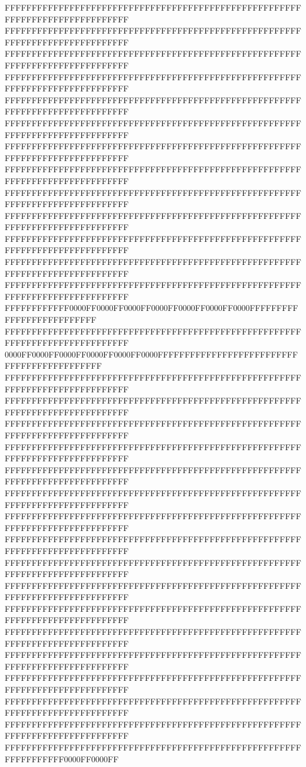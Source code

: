 FFFFFFFFFFFFFFFFFFFFFFFFFFFFFFFFFFFFFFFFFFFFFFFFFFFFFFFFFFFFFFFFFFFFFFFFFFFFFF
FFFFFFFFFFFFFFFFFFFFFFFFFFFFFFFFFFFFFFFFFFFFFFFFFFFFFFFFFFFFFFFFFFFFFFFFFFFFFF
FFFFFFFFFFFFFFFFFFFFFFFFFFFFFFFFFFFFFFFFFFFFFFFFFFFFFFFFFFFFFFFFFFFFFFFFFFFFFF
FFFFFFFFFFFFFFFFFFFFFFFFFFFFFFFFFFFFFFFFFFFFFFFFFFFFFFFFFFFFFFFFFFFFFFFFFFFFFF
FFFFFFFFFFFFFFFFFFFFFFFFFFFFFFFFFFFFFFFFFFFFFFFFFFFFFFFFFFFFFFFFFFFFFFFFFFFFFF
FFFFFFFFFFFFFFFFFFFFFFFFFFFFFFFFFFFFFFFFFFFFFFFFFFFFFFFFFFFFFFFFFFFFFFFFFFFFFF
FFFFFFFFFFFFFFFFFFFFFFFFFFFFFFFFFFFFFFFFFFFFFFFFFFFFFFFFFFFFFFFFFFFFFFFFFFFFFF
FFFFFFFFFFFFFFFFFFFFFFFFFFFFFFFFFFFFFFFFFFFFFFFFFFFFFFFFFFFFFFFFFFFFFFFFFFFFFF
FFFFFFFFFFFFFFFFFFFFFFFFFFFFFFFFFFFFFFFFFFFFFFFFFFFFFFFFFFFFFFFFFFFFFFFFFFFFFF
FFFFFFFFFFFFFFFFFFFFFFFFFFFFFFFFFFFFFFFFFFFFFFFFFFFFFFFFFFFFFFFFFFFFFFFFFFFFFF
FFFFFFFFFFFFFFFFFFFFFFFFFFFFFFFFFFFFFFFFFFFFFFFFFFFFFFFFFFFFFFFFFFFFFFFFFFFFFF
FFFFFFFFFFFFFFFFFFFFFFFFFFFFFFFFFFFFFFFFFFFFFFFFFFFFFFFFFFFFFFFFFFFFFFFFFFFFFF
FFFFFFFFFFFFFFFFFFFFFFFFFFFFFFFFFFFFFFFFFFFFFFFFFFFFFFFFFFFFFFFFFFFFFFFFFFFFFF
FFFFFFFFFFFF0000FF0000FF0000FF0000FF0000FF0000FF0000FFFFFFFFFFFFFFFFFFFFFFFFFF
FFFFFFFFFFFFFFFFFFFFFFFFFFFFFFFFFFFFFFFFFFFFFFFFFFFFFFFFFFFFFFFFFFFFFFFFFFFFFF
0000FF0000FF0000FF0000FF0000FF0000FFFFFFFFFFFFFFFFFFFFFFFFFFFFFFFFFFFFFFFFFFFF
FFFFFFFFFFFFFFFFFFFFFFFFFFFFFFFFFFFFFFFFFFFFFFFFFFFFFFFFFFFFFFFFFFFFFFFFFFFFFF
FFFFFFFFFFFFFFFFFFFFFFFFFFFFFFFFFFFFFFFFFFFFFFFFFFFFFFFFFFFFFFFFFFFFFFFFFFFFFF
FFFFFFFFFFFFFFFFFFFFFFFFFFFFFFFFFFFFFFFFFFFFFFFFFFFFFFFFFFFFFFFFFFFFFFFFFFFFFF
FFFFFFFFFFFFFFFFFFFFFFFFFFFFFFFFFFFFFFFFFFFFFFFFFFFFFFFFFFFFFFFFFFFFFFFFFFFFFF
FFFFFFFFFFFFFFFFFFFFFFFFFFFFFFFFFFFFFFFFFFFFFFFFFFFFFFFFFFFFFFFFFFFFFFFFFFFFFF
FFFFFFFFFFFFFFFFFFFFFFFFFFFFFFFFFFFFFFFFFFFFFFFFFFFFFFFFFFFFFFFFFFFFFFFFFFFFFF
FFFFFFFFFFFFFFFFFFFFFFFFFFFFFFFFFFFFFFFFFFFFFFFFFFFFFFFFFFFFFFFFFFFFFFFFFFFFFF
FFFFFFFFFFFFFFFFFFFFFFFFFFFFFFFFFFFFFFFFFFFFFFFFFFFFFFFFFFFFFFFFFFFFFFFFFFFFFF
FFFFFFFFFFFFFFFFFFFFFFFFFFFFFFFFFFFFFFFFFFFFFFFFFFFFFFFFFFFFFFFFFFFFFFFFFFFFFF
FFFFFFFFFFFFFFFFFFFFFFFFFFFFFFFFFFFFFFFFFFFFFFFFFFFFFFFFFFFFFFFFFFFFFFFFFFFFFF
FFFFFFFFFFFFFFFFFFFFFFFFFFFFFFFFFFFFFFFFFFFFFFFFFFFFFFFFFFFFFFFFFFFFFFFFFFFFFF
FFFFFFFFFFFFFFFFFFFFFFFFFFFFFFFFFFFFFFFFFFFFFFFFFFFFFFFFFFFFFFFFFFFFFFFFFFFFFF
FFFFFFFFFFFFFFFFFFFFFFFFFFFFFFFFFFFFFFFFFFFFFFFFFFFFFFFFFFFFFFFFFFFFFFFFFFFFFF
FFFFFFFFFFFFFFFFFFFFFFFFFFFFFFFFFFFFFFFFFFFFFFFFFFFFFFFFFFFFFFFFFFFFFFFFFFFFFF
FFFFFFFFFFFFFFFFFFFFFFFFFFFFFFFFFFFFFFFFFFFFFFFFFFFFFFFFFFFFFFFFFFFFFFFFFFFFFF
FFFFFFFFFFFFFFFFFFFFFFFFFFFFFFFFFFFFFFFFFFFFFFFFFFFFFFFFFFFFFFFFFFFFFFFFFFFFFF
FFFFFFFFFFFFFFFFFFFFFFFFFFFFFFFFFFFFFFFFFFFFFFFFFFFFFFFFFFFFFFFFFF0000FF0000FF
